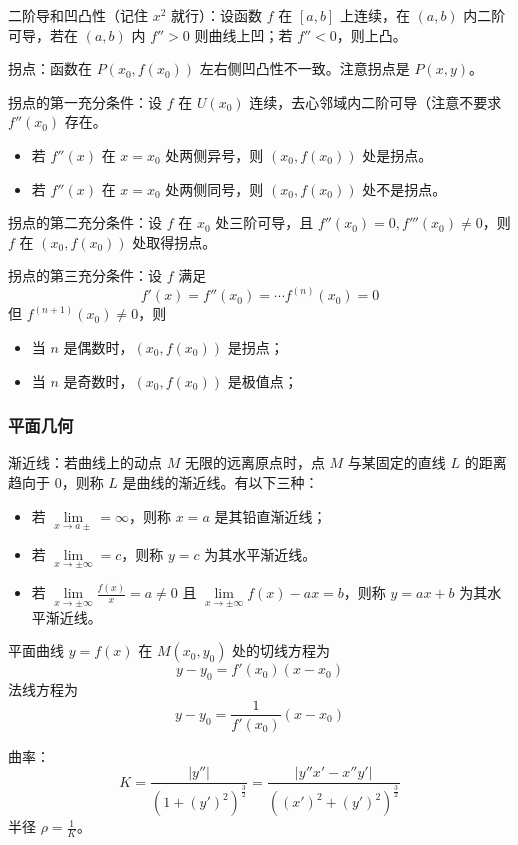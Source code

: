 二阶导和凹凸性（记住 $x^2$ 就行）：设函数 $f$ 在 $[a, b]$ 上连续，在 $(a, b)$ 内二阶可导，若在 $(a, b)$ 内 $f'' > 0$ 则曲线上凹；若 $f'' < 0$，则上凸。

拐点：函数在 $P(x_0, f(x_0))$ 左右侧凹凸性不一致。注意拐点是 $P(x, y)$。

拐点的第一充分条件：设 $f$ 在 $U(x_0)$ 连续，去心邻域内二阶可导（注意不要求 $f''(x_0)$ 存在。
\begin{itemize}
	\item 若 $f''(x)$ 在 $x=x_0$ 处两侧异号，则 $(x_0, f(x_0))$ 处是拐点。
	\item 若 $f''(x)$ 在 $x=x_0$ 处两侧同号，则 $(x_0, f(x_0))$ 处不是拐点。
\end{itemize}

拐点的第二充分条件：设 $f$ 在 $x_0$ 处三阶可导，且 $f''(x_0) = 0, f'''(x_0) \neq 0$，则 $f$ 在 $(x_0, f(x_0))$ 处取得拐点。

拐点的第三充分条件：设 $f$ 满足
\[ f'(x) = f''(x_0) = \cdots f^{(n)}(x_0) = 0 \]
但 $f^{(n+1)}(x_0) \neq 0$，则
\begin{itemize}
	\item 当 $n$ 是偶数时，$(x_0, f(x_0))$ 是拐点；
	\item 当 $n$ 是奇数时，$(x_0, f(x_0))$ 是极值点；
\end{itemize}

\subsubsection*{平面几何}

渐近线：若曲线上的动点 $M$ 无限的远离原点时，点 $M$ 与某固定的直线 $L$ 的距离趋向于 $0$，则称 $L$ 是曲线的渐近线。有以下三种：
\begin{itemize}
	\item 若 $\lim\limits_{x \to a\pm} = \infty$，则称 $x=a$ 是其铅直渐近线；
	\item 若 $\lim\limits_{x \to \pm \infty} = c$，则称 $y=c$ 为其水平渐近线。
	\item 若 $\lim\limits_{x \to \pm\infty}\frac{f(x)}{x} = a \neq 0$ 且 $\lim\limits_{x \to \pm\infty} f(x) - ax = b$，则称 $y = ax + b$ 为其水平渐近线。
\end{itemize}

平面曲线 $y = f(x)$ 在 $M(x_0, y_0)$ 处的切线方程为
\[ y - y_0 = f'(x_0)(x - x_0) \]
法线方程为
\[ y - y_0 = \frac{1}{f'(x_0)}(x - x_0) \]

曲率：
\[ K = \frac{|y''|}{\left(1 + (y')^2\right)^{\frac{3}{2}}} = \frac{|y''x' - x''y'|}{((x')^2 + (y')^2)^{\frac{3}{2}}} \]
半径 $\rho = \frac{1}{K}$。

